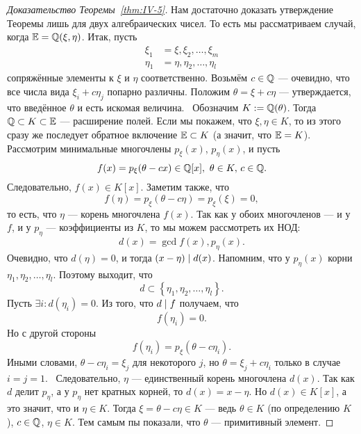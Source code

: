 \begin{proof}[Доказательство Теоремы~\ref{thm:IV-5}]
    Нам достаточно доказать утверждение Теоремы лишь для двух алгебраических чисел. То есть мы рассматриваем случай, когда $\mathbb{E} = \mathbb{Q}(\xi, \eta)$. Итак, пусть
    \begin{align*}
        \xi_1 &= \xi, \xi_2, \dots, \xi_m \\
        \eta_1 &= \eta, \eta_2, \dots, \eta_l
    \end{align*}
    сопряжённые элементы к $\xi$ и $\eta$ соответственно. Возьмём $c \in \mathbb{Q}$ --- очевидно, что все числа вида $\xi_i + c\eta_j$ попарно различны. Положим $\theta = \xi + c\eta$ --- утверждается, что введённое $\theta$ и есть искомая величина.~\newline
    Обозначим $K := \mathbb{Q}(\theta)$. Тогда $\mathbb{Q} \subset K \subset \mathbb{E}$ --- расширение полей. Если мы покажем, что $\xi, \eta \in K$, то из этого сразу же последует обратное включение $\mathbb{E} \subset K$ (а значит, что $\mathbb{E} = K$).~\newline
    Рассмотрим минимальные многочлены $p_{\xi}(x)$, $p_{\eta}(x)$, и пусть
    \[
        f(x) = p_\xi(\theta - cx) \in \mathbb{Q}[x],\ \theta \in K,\, c \in \mathbb{Q}.
    \]
    Следовательно, $f(x) \in K[x]$. Заметим также, что
    \[
        f(\eta) = p_{\xi}(\theta - c\eta) = p_{\xi}(\xi) = 0,
    \] 
    то есть, что $\eta$ --- корень многочлена $f(x)$. Так как у обоих многочленов --- и у $f$, и у $p_{\eta}$ --- коэффициенты из $K$, то мы можем рассмотреть их НОД:
    \[
        d(x) = \gcd{f(x), p_\eta(x)}.
    \]
    Очевидно, что $d(\eta) = 0$, и тогда $(x - \eta) \mid d(x)$. Напомним, что у $p_\eta(x)$ корни $\eta_1, \eta_2, \dots, \eta_l$. Поэтому выходит, что 
    \[
        d \subset \left\{ \eta_1, \eta_2, \dots, \eta_l \right\}.
    \]
    Пусть $\exists i\colon d\left( \eta_i \right) = 0$. Из того, что $d \mid f$ получаем, что 
    \[
        f\left( \eta_i \right) = 0.
    \]
    Но с другой стороны
    \[
        f\left( \eta_i \right) = p_{\xi}\left( \theta - c\eta_i \right).
    \]
    Иными словами, $\theta - c\eta_i = \xi_j$ для некоторого $j$, но $\theta = \xi_j + c\eta_i$ только в случае $i = j = 1$.~\newline
    Следовательно, $\eta$ --- единственный корень многочлена $d(x)$. Так как $d$ делит $p_\eta$, а у $p_\eta$ нет кратных корней, то $d(x) = x - \eta$. Но $d(x) \in K[x]$, а это значит, что и $\eta \in K$. Тогда $\xi = \theta - c\eta \in K$ --- ведь $\theta \in K$ (по определению $K$), $c \in \mathbb{Q}$, $\eta \in K$. Тем самым пы показали, что $\theta$ --- примитивный элемент.
\end{proof}

